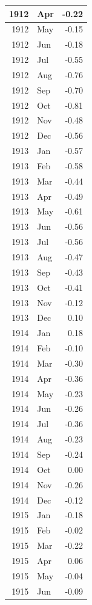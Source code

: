 \documentclass[
]{article}
\begin{document}
\begin{table}[H]
\begin{tabular}[t]{r|l|r}
\hline
1912 & Apr & -0.22\\
\hline
1912 & May & -0.15\\
\hline
1912 & Jun & -0.18\\
\hline
1912 & Jul & -0.55\\
\hline
1912 & Aug & -0.76\\
\hline
1912 & Sep & -0.70\\
\hline
1912 & Oct & -0.81\\
\hline
1912 & Nov & -0.48\\
\hline
1912 & Dec & -0.56\\
\hline
1913 & Jan & -0.57\\
\hline
1913 & Feb & -0.58\\
\hline
1913 & Mar & -0.44\\
\hline
1913 & Apr & -0.49\\
\hline
1913 & May & -0.61\\
\hline
1913 & Jun & -0.56\\
\hline
1913 & Jul & -0.56\\
\hline
1913 & Aug & -0.47\\
\hline
1913 & Sep & -0.43\\
\hline
1913 & Oct & -0.41\\
\hline
1913 & Nov & -0.12\\
\hline
1913 & Dec & 0.10\\
\hline
1914 & Jan & 0.18\\
\hline
1914 & Feb & -0.10\\
\hline
1914 & Mar & -0.30\\
\hline
1914 & Apr & -0.36\\
\hline
1914 & May & -0.23\\
\hline
1914 & Jun & -0.26\\
\hline
1914 & Jul & -0.36\\
\hline
1914 & Aug & -0.23\\
\hline
1914 & Sep & -0.24\\
\hline
1914 & Oct & 0.00\\
\hline
1914 & Nov & -0.26\\
\hline
1914 & Dec & -0.12\\
\hline
1915 & Jan & -0.18\\
\hline
1915 & Feb & -0.02\\
\hline
1915 & Mar & -0.22\\
\hline
1915 & Apr & 0.06\\
\hline
1915 & May & -0.04\\
\hline
1915 & Jun & -0.09\\

\end{tabular}
\end{table}
\end{document}
